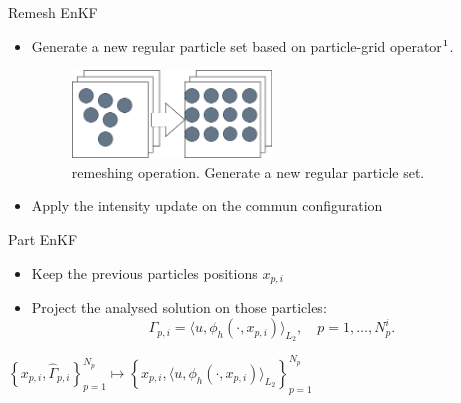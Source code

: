 \documentclass[aspectratio=169]{beamer} %
\begin{document}
\begin{frame}{Remesh EnKF}
    \subtitle{Regrid on a common particle configuration}
    \begin{itemize}
        \item Generate a new regular particle set based on particle-grid operator$\footnotemark[1]$.
              \begin{figure}
                  \centering
                  \includegraphics[width=0.5\textwidth]{images/remesh_enkf.png}
                  \caption{remeshing operation. Generate a new regular particle set.}
              \end{figure}
        \item Apply the intensity update on the commun configuration
    \end{itemize}

\end{frame}

\begin{frame}{Part EnKF}
    \subtitle{Project solution on each forecast configuration}
    \begin{itemize}
        \item Keep the previous particles positions $x_{p, i}$
        \item Project the analysed solution on those particles: \\
              \begin{equation*}
                  \Gamma_{p, i} = \langle u, \phi_h(\cdot,x_{p,i})\rangle_{L_2}, \quad p = 1, \dots, N_p^i.
              \end{equation*}
    \end{itemize}
    \vfill
    \centering
    $\left\{x_{p,i}, \hat \Gamma_{p,i}\right\}_{p=1}^{N_p} \mapsto \left\{x_{p,i}, \langle u, \phi_h(\cdot,x_{p,i})\rangle_{L_2} \right\}_{p=1}^{N_p}$
\end{frame}
\end{document}
